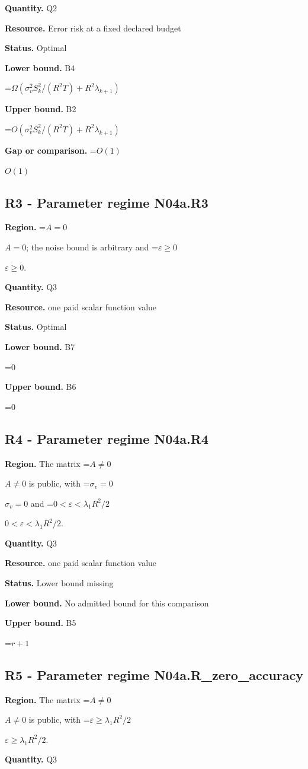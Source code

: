 \documentclass[10pt,a4paper]{article}
\newcommand{\AtlasMath}[1]{\par\begingroup\centering\setbox0=\hbox{$\displaystyle #1$}\ifdim\wd0>1.4\linewidth\typeout{ATLAS WIDE FORMULA: \the\wd0}\fi\ifdim\wd0>\linewidth\resizebox{\linewidth}{!}{\box0}\else\box0\fi\par\endgroup}
\newcommand{\AtlasInlineMath}[1]{\begingroup\setbox0=\hbox{$#1$}\ifdim\wd0>.4\linewidth\endgroup\AtlasMath{#1}\else\endgroup$#1$\fi}
\begin{document}
\textbf{Quantity.} Q2

\textbf{Resource.} Error risk at a fixed declared budget

\textbf{Status.} Optimal

\textbf{Lower bound.} B4

\AtlasMath{\Omega(\sigma_v^2S_k^2/(R^2T)+R^2\lambda_{k+1})}
\textbf{Upper bound.} B2

\AtlasMath{O(\sigma_v^2S_k^2/(R^2T)+R^2\lambda_{k+1})}
\textbf{Gap or comparison.} \AtlasInlineMath{O(1)}

\subsection{R3 - Parameter regime N04a.R3}
\textbf{Region.} \AtlasInlineMath{A=0}; the noise bound is arbitrary and \AtlasInlineMath{\varepsilon\ge0}.

\textbf{Quantity.} Q3

\textbf{Resource.} one paid scalar function value

\textbf{Status.} Optimal

\textbf{Lower bound.} B7

\AtlasMath{0}
\textbf{Upper bound.} B6

\AtlasMath{0}
\subsection{R4 - Parameter regime N04a.R4}
\textbf{Region.} The matrix \AtlasInlineMath{A\ne0} is public, with \AtlasInlineMath{\sigma_v=0} and \AtlasInlineMath{0<\varepsilon<\lambda_1R^2/2}.

\textbf{Quantity.} Q3

\textbf{Resource.} one paid scalar function value

\textbf{Status.} Lower bound missing

\textbf{Lower bound.} No admitted bound for this comparison

\textbf{Upper bound.} B5

\AtlasMath{r+1}
\subsection{R5 - Parameter regime N04a.R\_zero\_accuracy}
\textbf{Region.} The matrix \AtlasInlineMath{A\ne0} is public, with \AtlasInlineMath{\varepsilon\ge\lambda_1R^2/2}.

\textbf{Quantity.} Q3
\end{document}
